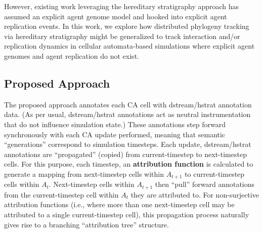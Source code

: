 However, existing work leveraging the hereditary stratigraphy approach has assumed an explicit agent genome model and hooked into explicit agent replication events.
In this work, we explore how distributed phylogeny tracking via hereditary stratigraphy might be generalized to track interaction and/or replication dynamics in cellular automata-based simulations where explicit agent genomes and agent replication do not exist.

\subsection{Proposed Approach}



The proposed approach annotates each CA cell with dstream/hstrat annotation data.
(As per usual, dstream/hstrat annotations act as neutral instrumentation that do not influence simulation state.)
These annotations step forward synchronously with each CA update performed, meaning that semantic ``generations'' correspond to simulation timesteps.
Each update, dstream/hstrat annotations are ``propagated'' (copied) from current-timestep to next-timestep cells.
For this purpose, each timestep, an \textbf{attribution function} is calculated to generate a mapping from next-timestep cells within $A_{t+1}$ to current-timestep cells within $A_{t}$.
Next-timestep cells within $A_{t+1}$ then ``pull'' forward annotations from the current-timestep cell within $A_{t}$ they are attributed to.
For non-surjective attribution functions (i.e., where more than one next-timestep cell may be attributed to a single current-timestep cell), this propagation process naturally gives rise to a branching ``attribution tree'' structure.

